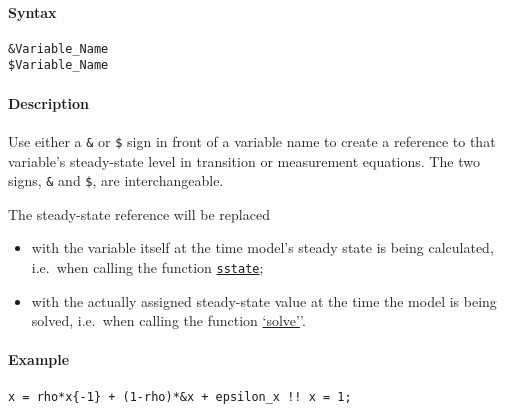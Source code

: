 


	\paragraph{Syntax}

\begin{verbatim}
&Variable_Name
$Variable_Name
\end{verbatim}

\paragraph{Description}

Use either a \texttt{\&} or \texttt{\$} sign in front of a variable name
to create a reference to that variable's steady-state level in
transition or measurement equations. The two signs, \texttt{\&} and
\texttt{\$}, are interchangeable.

The steady-state reference will be replaced

\begin{itemize}
\item
  with the variable itself at the time model's steady state is being
  calculated, i.e.~when calling the function
  \href{model/sstate}{\texttt{sstate}};
\item
  with the actually assigned steady-state value at the time the model is
  being solved, i.e.~when calling the function
  \href{model/solve}{`solve'}'.
\end{itemize}

\paragraph{Example}

\begin{verbatim}
x = rho*x{-1} + (1-rho)*&x + epsilon_x !! x = 1;
\end{verbatim}


